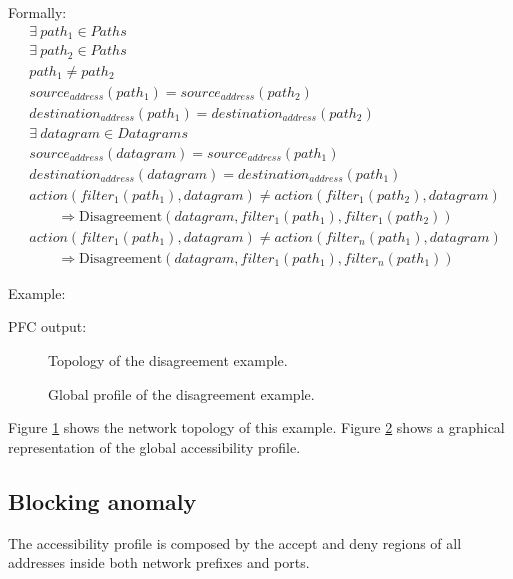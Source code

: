 Formally:
\begin{align*}
	& \exists ~ path_1 \in Paths \\
	& \exists ~ path_2 \in Paths \\
	& path_1 \not= path_2 \\
	& source_{address}(path_1) = source_{address}(path_2) \\
	& destination_{address}(path_1) = destination_{address}(path_2) \\
	& \exists ~ datagram \in Datagrams \\
	& source_{address}(datagram) = source_{address}(path_1) \\
	& destination_{address}(datagram) = destination_{address}(path_1) \\
	& action(filter_1(path_1), datagram) \not= action(filter_1(path_2), datagram) \\
	& \qquad \Rightarrow \mbox{Disagreement}(datagram, filter_1(path_1), filter_1(path_2)) \\
	& action(filter_1(path_1), datagram) \not= action(filter_n(path_1), datagram) \\
	& \qquad \Rightarrow \mbox{Disagreement}(datagram, filter_1(path_1), filter_n(path_1))
\end{align*}

Example:



PFC output:



\begin{figure}
	\caption{\label{fig:exdisa:topo}Topology of the disagreement example.}
\end{figure}

\begin{figure}
	\caption{\label{fig:exdisa:profile}Global profile of the disagreement example.}
\end{figure}

Figure \ref{fig:exdisa:topo} shows the network topology of this example. Figure
\ref{fig:exdisa:profile} shows a graphical representation of the global
accessibility profile.



\subsection{Blocking anomaly}

The accessibility profile is composed by the accept and deny regions of all
addresses inside both network prefixes and ports.

